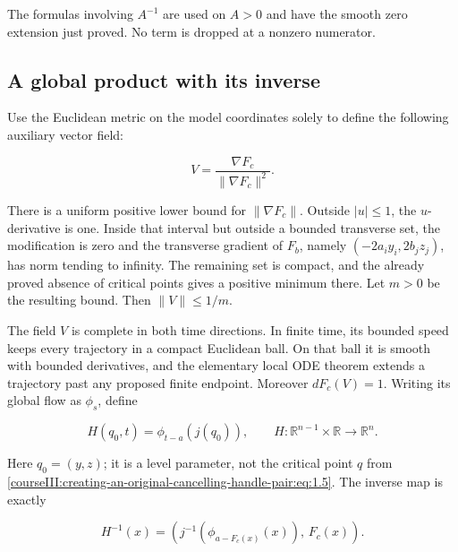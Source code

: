 The formulas involving \(A^{-1}\) are used on \(A>0\) and have the smooth zero extension just proved. No term is dropped at a nonzero numerator.

\subsection{A global product with its inverse}
\label{courseIII:creating-an-original-cancelling-handle-pair:pair-global-product}

\label{courseIII:creating-an-original-cancelling-handle-pair:section-3}\label{courseIII:pair-creation:3}

Use the Euclidean metric on the model coordinates solely to define the following auxiliary vector field:

\begin{equation}
V=\frac{\nabla F_c}{\|\nabla F_c\|^2}.
 \label{courseIII:creating-an-original-cancelling-handle-pair:eq:3.1}
\end{equation}

There is a uniform positive lower bound for \(\|\nabla F_c\|\). Outside \(|u|\leq1\), the \(u\)-derivative is one. Inside that interval but outside a bounded transverse set, the modification is zero and the transverse gradient of \(F_b\), namely \((-2a_i y_i,2b_jz_j)\), has norm tending to infinity. The remaining set is compact, and the already proved absence of critical points gives a positive minimum there. Let \(m>0\) be the resulting bound. Then \(\|V\|\leq1/m\).

The field \(V\) is complete in both time directions. In finite time, its bounded speed keeps every trajectory in a compact Euclidean ball. On that ball it is smooth with bounded derivatives, and the elementary local ODE theorem extends a trajectory past any proposed finite endpoint. Moreover \(dF_c(V)=1\). Writing its global flow as \(\phi_s\), define

\begin{equation}
H(q_0,t)=\phi_{t-a}(j(q_0)),\qquad
 H:\mathbb R^{n-1}\times\mathbb R\longrightarrow\mathbb R^n.
 \label{courseIII:creating-an-original-cancelling-handle-pair:eq:3.2}
\end{equation}

Here \(q_0=(y,z)\); it is a level parameter, not the critical point \(q\) from \eqref{courseIII:creating-an-original-cancelling-handle-pair:eq:1.5}. The inverse map is exactly

\begin{equation}
H^{-1}(x)=
 \left(j^{-1}(\phi_{a-F_c(x)}(x)),\,F_c(x)\right).
 \label{courseIII:creating-an-original-cancelling-handle-pair:eq:3.3}
\end{equation}

